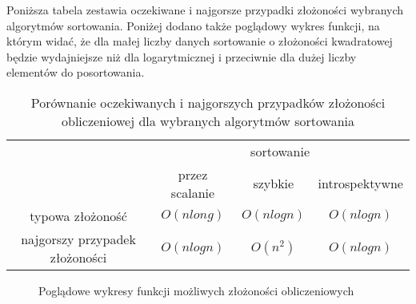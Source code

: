 Poniższa tabela zestawia oczekiwane i najgorsze przypadki złożoności wybranych algorytmów sortowania. Poniżej dodano także poglądowy wykres funkcji, na którym widać, że dla małej liczby danych sortowanie o złożoności kwadratowej będzie wydajniejsze niż dla logarytmicznej i przeciwnie dla dużej liczby elementów do posortowania.

\begin{table}[H]
    \centering
    \caption{Porównanie oczekiwanych i najgorszych przypadków złożoności obliczeniowej dla wybranych algorytmów sortowania}
    \label{tab: opis_zlozonosc}
    \begin{tabular}{c|ccc|}
        \cline{2-4}
        & \multicolumn{3}{c|}{sortowanie}   \\ \cline{2-4} & \multicolumn{1}{c|}{przez scalanie} & \multicolumn{1}{c|}{szybkie} & introspektywne \\ \hline
        \multicolumn{1}{|c|}{typowa złożoność} & \multicolumn{1}{c|}{$O(nlong)$} & \multicolumn{1}{c|}{$O(nlogn)$} & $O(nlogn)$       \\ \hline
        \multicolumn{1}{|c|}{najgorszy przypadek złożoności} & \multicolumn{1}{c|}{$O(nlogn)$} & \multicolumn{1}{c|}{$O(n^2)$} & $O(nlogn)$       \\ \hline
    \end{tabular}
\end{table}

\begin{figure}[H]
    \centering
    \caption{Poglądowe wykresy funkcji możliwych złożoności obliczeniowych}
    \label{fig: pogladowe_wykresy}
\end{figure}


